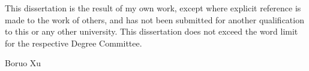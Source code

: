 \begin{declaration}
  This dissertation is the result of my own work, except where explicit
  reference is made to the work of others, and has not been submitted
  for another qualification to this or any other university. This
  dissertation does not exceed the word limit for the respective Degree
  Committee.
  \vspace*{1cm}
  \begin{flushright}
    Boruo Xu
  \end{flushright}
\end{declaration}










